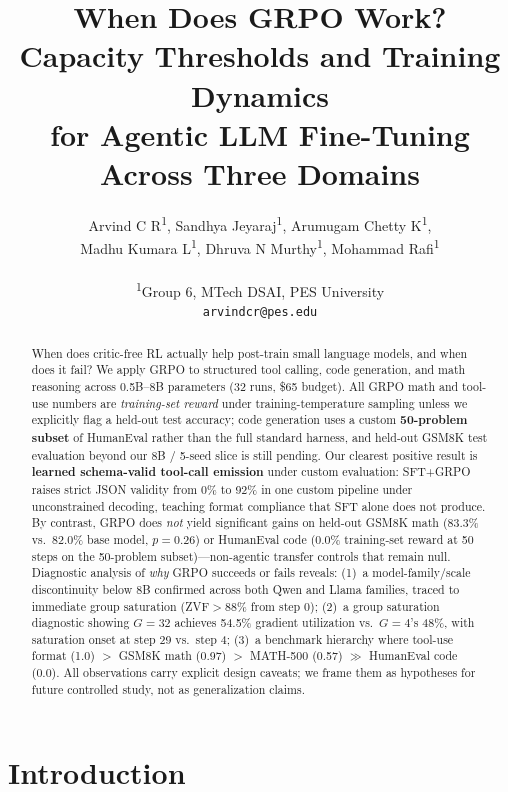 \documentclass{article}
\title{When Does GRPO Work? Capacity Thresholds and Training Dynamics\\for Agentic LLM Fine-Tuning Across Three Domains}
\author{
  Arvind C R\textsuperscript{1},
  Sandhya Jeyaraj\textsuperscript{1},
  Arumugam Chetty K\textsuperscript{1},\\
  Madhu Kumara L\textsuperscript{1},
  Dhruva N Murthy\textsuperscript{1},
  Mohammad Rafi\textsuperscript{1}\\
  \\
  \textsuperscript{1}Group 6, MTech DSAI, PES University\\
  \texttt{arvindcr@pes.edu}
}
\begin{document}
\maketitle

\begin{abstract}
  When does critic-free RL actually help post-train small language models, and when does it fail? We apply GRPO to structured tool calling, code generation, and math reasoning across 0.5B--8B parameters (32 runs, \$65 budget). All GRPO math and tool-use numbers are \emph{training-set reward} under training-temperature sampling unless we explicitly flag a held-out test accuracy; code generation uses a custom \textbf{50-problem subset} of HumanEval rather than the full standard harness, and held-out GSM8K test evaluation beyond our 8B / 5-seed slice is still pending. Our clearest positive result is \textbf{learned schema-valid tool-call emission} under custom evaluation: SFT+GRPO raises strict JSON validity from 0\% to 92\% in one custom pipeline under unconstrained decoding, teaching format compliance that SFT alone does not produce. By contrast, GRPO does \emph{not} yield significant gains on held-out GSM8K math (83.3\% vs.\ 82.0\% base model, $p{=}0.26$) or HumanEval code (0.0\% training-set reward at 50 steps on the 50-problem subset)---non-agentic transfer controls that remain null. Diagnostic analysis of \emph{why} GRPO succeeds or fails reveals: (1)~a model-family/scale discontinuity below 8B confirmed across both Qwen and Llama families, traced to immediate group saturation (ZVF$>$88\% from step 0); (2)~a group saturation diagnostic showing $G{=}32$ achieves 54.5\% gradient utilization vs.\ $G{=}4$'s 48\%, with saturation onset at step 29 vs.\ step 4; (3)~a benchmark hierarchy where tool-use format (1.0) $>$ GSM8K math (0.97) $>$ MATH-500 (0.57) $\gg$ HumanEval code (0.0). All observations carry explicit design caveats; we frame them as hypotheses for future controlled study, not as generalization claims.
\end{abstract}

\section{Introduction}
\end{document}
